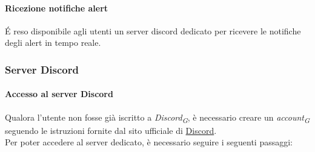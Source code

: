 \paragraph{Ricezione notifiche alert}
É reso disponibile agli utenti un server discord dedicato per ricevere le notifiche degli alert in tempo reale. \\


\subsubsection{Server Discord}

\paragraph{Accesso al server Discord}
Qualora l'utente non fosse già iscritto a \textit{Discord}\textsubscript{\textit{G}}, è necessario creare un \textit{account}\textsubscript{\textit{G}} seguendo le istruzioni fornite dal sito ufficiale di \href{https://discord.com/}{Discord}. \\
Per poter accedere al server dedicato, è necessario seguire i seguenti passaggi:
